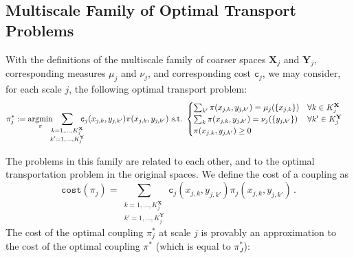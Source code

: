 \documentclass[twoside,11pt]{article}
\newcommand{\cost}[0]{\mathtt{c}}
\newcommand{\couplingcost}[0]{\mathtt{cost}}
\newcommand{\coupling}[0]{\pi}
\def\argmin{\mathop{\rm argmin}}
\newcommand{\Xsp}{{\mathbf{X}}}
\newcommand{\Ysp}{{\mathbf{Y}}}
\begin{document}
\subsection{Multiscale Family of Optimal Transport Problems}
\label{sec:multiscaleproblems}
With the definitions of the multiscale family of coarser spaces ${\Xsp}_j$ and
${\Ysp}_j$, corresponding measures $\mu_j$ and $\nu_j$, and corresponding cost
$\cost_j$, we may consider, for each scale $j$, the following optimal transport
problem:
\begin{equation}
\begin{aligned}
\coupling_j^*&: = \argmin_\coupling\!\!\!\sum_{\substack{k=1,\dots,K_j^{{\Xsp}}\\ k'=1,\dots,K_j^{{\Ysp}}}} 
              \!\!\!\!\cost_j(x_{j,k}, y_{j,k'}) \coupling(x_{j,k}, y_{j,k'}) 
              \,\,\text{s.t.}\,\,
\begin{cases}
\sum_{k'} \coupling(x_{j,k}, y_{j,k'}) = \mu_j(\{x_{j,k}\}) & \forall k\in K_j^\Xsp \\ 
\sum_{k} \coupling(x_{j,k}, y_{j,k'}) = \nu_j(\{y_{j,k'}\}) & \forall k'\in K_j^\Ysp\\
 \coupling(x_{j,k},y_{j,k'})\ge 0
\end{cases}
\label{e:LPformulation_j}
\end{aligned}
\end{equation}

The problems in this family are related to each other, and to the optimal transportation
problem in the original spaces. We define the cost of a coupling as
\begin{equation}
\couplingcost(\coupling_j) = \sum_{\substack{k=1,\dots,K_j^{{\Xsp}}\\
k'=1,\dots,K_j^{{\Ysp}}}}  \cost_j(x_{j,k}, y_{j,k'}) \coupling_j(x_{j,k},
y_{j,k'}) \, . 
\end{equation}
The cost of the optimal coupling $\coupling_j^*$ at scale $j$ is provably an
approximation to the cost of the optimal coupling $\coupling^*$ (which is equal
to $\coupling_J^*$):
\end{document}
